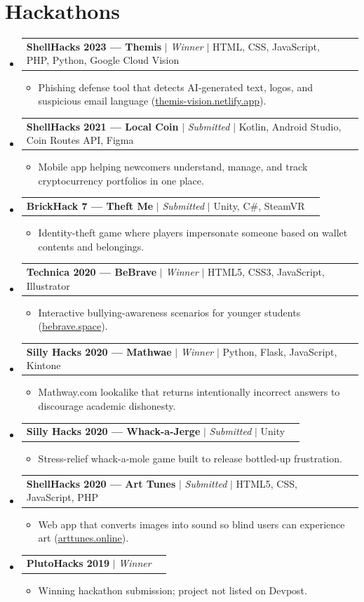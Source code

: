 \documentclass[letterpaper,11pt]{article}
\makeatletter
\newcommand{\resumeItem}[1]{
  \item\small{
    {#1 \vspace{-2pt}}
  }
}
\newcommand{\resumeProjectHeading}[2]{
    \item
    \begin{tabular*}{0.97\textwidth}{l@{\extracolsep{\fill}}r}
      \small#1 & #2 \\
    \end{tabular*}\vspace{-7pt}
}
\newcommand{\resumeSubHeadingListStart}{\begin{itemize}[leftmargin=0.15in, label={}]}
\newcommand{\resumeSubHeadingListEnd}{\end{itemize}}
\newcommand{\resumeItemListStart}{\begin{itemize}}
\newcommand{\resumeItemListEnd}{\end{itemize}\vspace{-5pt}}
\makeatother
\begin{document}
\section{Hackathons}
  \resumeSubHeadingListStart
    \resumeProjectHeading
      {\textbf{ShellHacks 2023 --- Themis} $|$ \emph{Winner} $|$ HTML, CSS, JavaScript, PHP, Python, Google Cloud Vision}{}
      \resumeItemListStart
        \resumeItem{Phishing defense tool that detects AI-generated text, logos, and suspicious email language (\href{https://themis-vision.netlify.app}{themis-vision.netlify.app}).}
      \resumeItemListEnd
    \resumeProjectHeading
      {\textbf{ShellHacks 2021 --- Local Coin} $|$ \emph{Submitted} $|$ Kotlin, Android Studio, Coin Routes API, Figma}{}
      \resumeItemListStart
        \resumeItem{Mobile app helping newcomers understand, manage, and track cryptocurrency portfolios in one place.}
      \resumeItemListEnd
    \resumeProjectHeading
      {\textbf{BrickHack 7 --- Theft Me} $|$ \emph{Submitted} $|$ Unity, C\#, SteamVR}{}
      \resumeItemListStart
        \resumeItem{Identity-theft game where players impersonate someone based on wallet contents and belongings.}
      \resumeItemListEnd
    \resumeProjectHeading
      {\textbf{Technica 2020 --- BeBrave} $|$ \emph{Winner} $|$ HTML5, CSS3, JavaScript, Illustrator}{}
      \resumeItemListStart
        \resumeItem{Interactive bullying-awareness scenarios for younger students (\href{https://bebrave.space}{bebrave.space}).}
      \resumeItemListEnd
    \resumeProjectHeading
      {\textbf{Silly Hacks 2020 --- Mathwae} $|$ \emph{Winner} $|$ Python, Flask, JavaScript, Kintone}{}
      \resumeItemListStart
        \resumeItem{Mathway.com lookalike that returns intentionally incorrect answers to discourage academic dishonesty.}
      \resumeItemListEnd
    \resumeProjectHeading
      {\textbf{Silly Hacks 2020 --- Whack-a-Jerge} $|$ \emph{Submitted} $|$ Unity}{}
      \resumeItemListStart
        \resumeItem{Stress-relief whack-a-mole game built to release bottled-up frustration.}
      \resumeItemListEnd
    \resumeProjectHeading
      {\textbf{ShellHacks 2020 --- Art Tunes} $|$ \emph{Submitted} $|$ HTML5, CSS, JavaScript, PHP}{}
      \resumeItemListStart
        \resumeItem{Web app that converts images into sound so blind users can experience art (\href{https://arttunes.online}{arttunes.online}).}
      \resumeItemListEnd
    \resumeProjectHeading
      {\textbf{PlutoHacks 2019} $|$ \emph{Winner}}{}
      \resumeItemListStart
        \resumeItem{Winning hackathon submission; project not listed on Devpost.}
      \resumeItemListEnd
  \resumeSubHeadingListEnd
\end{document}
